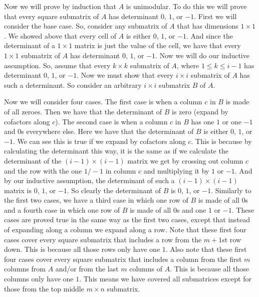 \documentclass{article}
\begin{document}
\begin{description}
        Now we will prove by induction that $A$ is unimodular. To do this we
        will prove that every square submatrix of $A$ has determinant $0$, $1$,
        or $-1$.
        First we will consider the base case. So, consider any submatrix of $A$
        that has dimensions $1 \times 1$. We showed above that every cell of $A$
        is either $0$, $1$, or $-1$. And since the determinant of a $1 \times 1$
        matrix is just the value of the cell, we have that every $1 \times 1$
        submatrix of $A$ has determinant $0$, $1$, or $-1$. Now we will do our inductive
        assumption. So, assume that every $k \times k$ submatrix of
        $A$, where $1 \le k \le i - 1$ has determinant $0$, $1$, or $-1$.
        Now we must show that every $i \times i$ submatrix of
        $A$ has such a determinant. So consider an arbitrary $i \times i$
        submatrix $B$ of $A$.

        Now we will consider four cases. The first case is when a column $c$ in
        $B$ is made of all
        zeroes. Then we have that the determinant of $B$ is zero (expand by
        cofactors along $c$). The second case is
        when a column $c$ in $B$ has one $1$ or one $-1$ and $0$s everywhere else.
        Here we have that the determinant of $B$ is either $0$, $1$,
        or $-1$. We can see this is true if we expand by cofactors along $c$.
        This is because by calculating the determinant this way, it is the same
        as if we calculate the determinant of the $(i - 1) \times (i - 1)$
        matrix we get by crossing out column $c$ and the row with the one $1/-1$ in
        column $c$ and multiplying it by $1$ or $-1$. And by our inductive
        assumption, the determinant of such a $(i - 1) \times (i - 1)$ matrix is
        $0$, $1$, or $-1$. So clearly the determinant of $B$ is $0$, $1$, or
        $-1$.
        Similarly to the first two cases, we
        have a third case in which one row of $B$ is made of all $0$s and a
        fourth case in which one row of $B$ is made of all $0$s and one
        $1$ or $-1$. These cases are proved true in the same way as the first
        two cases, except that instead of expanding along a column we expand
        along a row.
        Note that these first four cases cover every square submatrix that
        includes a row from the $m+1$st row down. This is because
        all those rows only have one $1$. Also note that these first four cases
        cover every square submatrix that includes a column from the first $m$
        columns from $A$ and/or from the last $m$ columns of $A$.
        This is because all those columns only have
        one $1$. This means we have covered all submatrices except for those
        from the top middle $m \times n$ submatrix.


\end{description}
\end{document}
